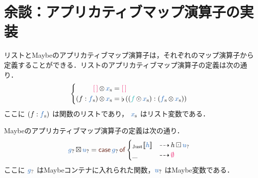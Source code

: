 \documentclass[a5paper,twoside,fleqn,draft]{jsbook}
\def\[{[\![}
\def\]{]\!]}
\def\constantColor{WildStrawberry}
\def\keywordColor{Sepia}
\def\varColor{NavyBlue}
\def\funcColor{BlueGreen}
\newcommand{\mKeyword}[1]{\textcolor{\keywordColor}{\mathsf{#1}}}
\newcommand{\mIfKeyword}{\mKeyword{if}}
\newcommand{\mCaseKeyword}{\mKeyword{case}}
\newcommand{\mOfKeyword}{\mKeyword{of}}
\newcommand{\mOtherwiseKeyword}{\mKeyword{otherwise}}
\DeclareMathOperator{\mCaseKW}{\mCaseKeyword}
\DeclareMathOperator{\mIf}{\mIfKeyword}
\DeclareMathOperator{\mOfKW}{\mOfKeyword}
\DeclareMathOperator{\mOtherwise}{\mOtherwiseKeyword}
\newcommand{\mEmptyList}{{\textcolor{\constantColor}{[\,]}}}
\newcommand{\mNothing}{\textcolor{\constantColor}{\emptyset}}
\newcommand{\mVar}[1]{\textcolor{\varColor}{#1}}
\newcommand{\mXVar}{\mVar{x}}
\newcommand{\mFunc}[1]{\textcolor{\funcColor}{#1}}
\newcommand{\mFFunc}{{\mFunc{f}}}
\DeclareMathOperator{\mAppMapList}{\otimes}
\DeclareMathOperator{\mAppMapMaybe}{\boxtimes}
\DeclareMathOperator{\mIfSo}{\dashrightarrow}
\DeclareMathOperator{\mJoinList}{\flat} %
\DeclareMathOperator{\mLogicalAnd}{\wedge}
\DeclareMathOperator{\mMapList}{\odot}
\DeclareMathOperator{\mMapMaybe}{\boxdot}
\newcommand{\mValueConstructor}[1]{\mathrm{#1}}
\newcommand{\mValueWith}[2]{{}_\mValueConstructor{#1}\[\mVar{#2}\]}
\newcommand{\mJustWith}[1]{\mValueWith{Just}{#1}}
\newcommand{\mList}[1]{\mVar{#1}_\mathrm{s}}
\newcommand{\mMaybe}[1]{\mVar{#1}_?}
\newcommand{\mCaseOf}[1]{\mCaseKW#1\mOfKW}
\begin{document}
\section{余談：アプリカティブマップ演算子の実装}

リストとMaybeのアプリカティブマップ演算子は，それぞれのマップ演算子から定義することができる．リストのアプリカティブマップ演算子の定義は次の通り．
\begin{equation}
  \left\{
  \begin{aligned}
    \mEmptyList\mAppMapList\mList{x}
    &=\mEmptyList\\
    (f:\mList{f})\mAppMapList\mList{x}
    &=\mJoinList{}((\mFFunc\mMapList\mList{x}):(\mList{f}\mAppMapList\mList{x}))
  \end{aligned}
  \right.
\end{equation}
ここに $(f:\mList{f})$ は関数のリストであり， $\mList{x}$ はリスト変数である．

Maybeのアプリカティブマップ演算子の定義は次の通り．
\begin{equation}
\label{eq:maybe-applicative-map-by-maybe-map}
\mMaybe{g}\mAppMapMaybe\mMaybe{u}
=\mCaseOf{\mMaybe{g}}
\begin{cases}
\mJustWith{h}&\mIfSo h\mMapMaybe\mMaybe{u}\\
\_&\mIfSo\mNothing
\end{cases}
\end{equation}
ここに $\mMaybe{g}$ はMaybeコンテナに入れられた関数，$\mMaybe{u}$ はMaybe変数である．
\end{document}
